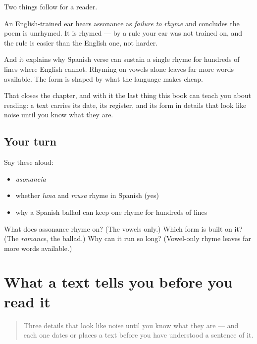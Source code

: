 \begin{grammarlens}[title={What you've built}]
Two things follow for a reader.

An English-trained ear hears assonance as \emph{failure to rhyme} and concludes the poem is unrhymed. It is rhymed — by a rule your ear was not trained on, and the rule is easier than the English one, not harder.

And it explains why Spanish verse can sustain a single rhyme for hundreds of lines where English cannot. Rhyming on vowels alone leaves far more words available. The form is shaped by what the language makes cheap.

That closes the chapter, and with it the last thing this book can teach you about reading: a text carries its date, its register, and its form in details that look like noise until you know what they are.
\end{grammarlens}

\subsection*{Your turn}
Say these aloud:

\begin{itemize}
\raggedright
  \item \emph{asonancia}
  \item whether \emph{luna} and \emph{musa} rhyme in Spanish (yes)
  \item why a Spanish ballad can keep one rhyme for hundreds of lines
\end{itemize}

\begin{tcolorbox}[breakable,colback=teal!4,colframe=teal!35!black,title={Before you move on}]
What does assonance rhyme on? (The vowels only.) Which form is built on it? (The \emph{romance}, the ballad.) Why can it run so long? (Vowel-only rhyme leaves far more words available.)
\end{tcolorbox}
\section[Practice]{What a text tells you before you read it}

\label{lesson:ES-C276-practice}



\begin{quote}
Three details that look like noise until you know what they are — and each one dates or places a text before you have understood a sentence of it.
\end{quote}

